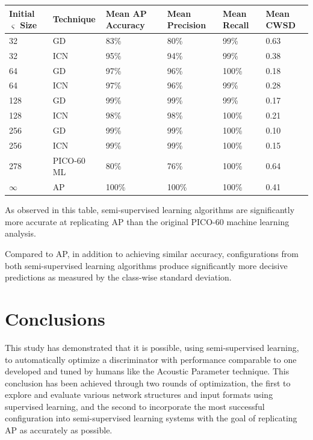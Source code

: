 \documentclass[10pt]{article}
\begin{document}
\begin{minipage}{\textwidth}
    \begin{center}
        \begin{tabular}{|l|l|l|l|l|l|}
            \hline
            Initial $\varsigma$ Size & Technique & Mean AP Accuracy & Mean Precision & Mean Recall & Mean CWSD \\
            \hline
            32 & GD & 83\% & 80\% & 99\% & 0.63 \\
            \hline
            32 & ICN & 95\% & 94\% & 99\% & 0.38 \\
            \hline
            64 & GD & 97\% & 96\% & 100\% & 0.18 \\
            \hline
            64 & ICN & 97\% & 96\% & 99\% & 0.28 \\
            \hline
            128 & GD & 99\% & 99\% & 99\% & 0.17 \\
            \hline
            128 & ICN & 98\% & 98\% & 100\% & 0.21 \\
            \hline
            256 & GD & 99\% & 99\% & 100\% & 0.10 \\
            \hline
            256 & ICN & 99\% & 99\% & 100\% & 0.15 \\
            \hline
            278 & PICO-60 ML & 80\% & 76\% & 100\% & 0.64 \\
            \hline
            $\infty$ & AP & 100\% & 100\% & 100\% & 0.41 \\
            \hline
        \end{tabular}
    \end{center}
\end{minipage}

As observed in this table, semi-supervised learning algorithms are significantly more accurate at replicating AP than the original PICO-60 machine learning analysis.

Compared to AP, in addition to achieving similar accuracy, configurations from both semi-supervised learning algorithms produce significantly more decisive predictions as measured by the class-wise standard deviation.

\section{Conclusions}

This study has demonstrated that it is possible, using semi-supervised learning, to automatically optimize a discriminator with performance comparable to one developed and tuned by humans like the Acoustic Parameter technique. This conclusion has been achieved through two rounds of optimization, the first to explore and evaluate various network structures and input formats using supervised learning, and the second to incorporate the most successful configuration into semi-supervised learning systems with the goal of replicating AP as accurately as possible.
\end{document}
